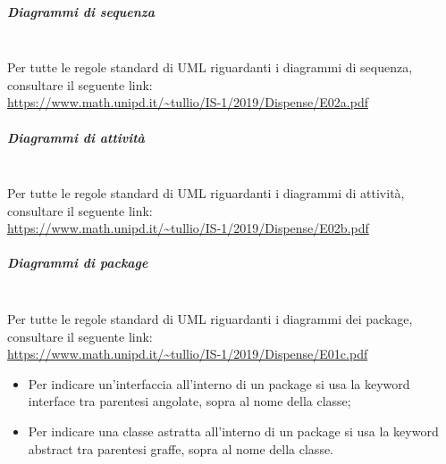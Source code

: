 \subparagraph*{Diagrammi di sequenza} \mbox{}\\
Per tutte le regole standard di UML riguardanti i diagrammi di sequenza, consultare il seguente link:
\\
\url{https://www.math.unipd.it/~tullio/IS-1/2019/Dispense/E02a.pdf}


\subparagraph*{Diagrammi di attività} \mbox{}\\
Per tutte le regole standard di UML riguardanti i diagrammi di attività, consultare il seguente link:
\\ \url{https://www.math.unipd.it/~tullio/IS-1/2019/Dispense/E02b.pdf}

\subparagraph*{Diagrammi di package}\mbox{}\\
Per tutte le regole standard di UML riguardanti i diagrammi dei package, consultare il seguente link: 
\\
\url{https://www.math.unipd.it/~tullio/IS-1/2019/Dispense/E01c.pdf}

\begin{itemize}
	\item Per indicare un'interfaccia all'interno di un package si usa la keyword interface tra parentesi angolate, sopra al nome della classe;
	\item Per indicare una classe astratta all'interno di un package si usa la keyword abstract tra parentesi graffe, sopra al nome della classe.
\end{itemize}
